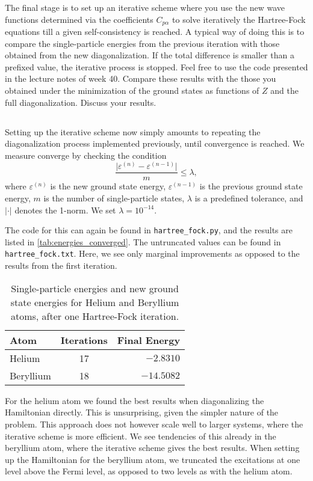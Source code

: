 The final stage is to set up an iterative scheme where you use the new wave functions determined via the coefficients $C_{p\alpha}$ to solve iteratively the Hartree-Fock equations till a given self-consistency is reached.
A typical way of doing this is to compare the single-particle energies from the previous iteration with those obtained from the new diagonalization.
If the total difference is smaller than a prefixed value, the iterative process is stopped.
Feel free to use the code presented in the lecture notes of week 40.
Compare these results with the those you obtained under the minimization of the ground states as functions of $Z$ and the full diagonalization.
Discuss your results.

\subsection{}
Setting up the iterative scheme now simply amounts to repeating the diagonalization process implemented previously, until convergence is reached.
We measure converge by checking the condition
\begin{equation*}
    \frac{\lvert \varepsilon^{(n)} - \varepsilon^{(n-1)} \rvert}{m} \leq \lambda,
\end{equation*}
where $\varepsilon^{(n)}$ is the new ground state energy, $\varepsilon^{(n-1)}$ is the previous ground state energy, $m$ is the number of single-particle states, $\lambda$ is a predefined tolerance, and $\lvert \cdot \rvert$ denotes the 1-norm.
We set $\lambda = 10^{-14}$.

The code for this can again be found in \verb|hartree_fock.py|, and the results are listed in \autoref{tab:energies_converged}.
The untruncated values can be found in \verb|hartree_fock.txt|.
Here, we see only marginal improvements as opposed to the results from the first iteration.

\begin{table}[h!]
    \caption{Single-particle energies and new ground state energies for Helium and Beryllium atoms, after one Hartree-Fock iteration.\label{tab:energies_converged}}
    \centering
    \small
    \begin{tabular}{lcr}
        \toprule\toprule
        Atom & Iterations & Final Energy \\ \midrule
        Helium & 17 & $-2.8310$ \\ \midrule
        Beryllium & 18 & $-14.5082$ \\ \bottomrule
    \end{tabular}
\end{table}

For the helium atom we found the best results when diagonalizing the Hamiltonian directly.
This is unsurprising, given the simpler nature of the problem.
This approach does not however scale well to larger systems, where the iterative scheme is more efficient.
We see tendencies of this already in the beryllium atom, where the iterative scheme gives the best results.
When setting up the Hamiltonian for the beryllium atom, we truncated the excitations at one level above the Fermi level, as opposed to two levels as with the helium atom.
